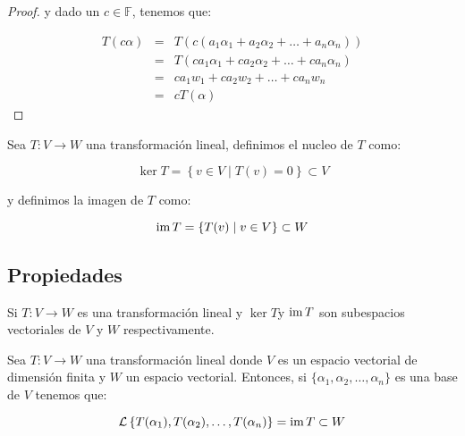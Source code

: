 \begin{proof}
			y dado un $c \in \mathbb{F}$, tenemos que:

			\begin{eqnarray*}
				T(c \alpha) & = & T(c (a_1 \alpha_1 + a_2 \alpha_2 + \dots + a_n \alpha_n)) \\
				& = & T(c a_1 \alpha_1 + c a_2 \alpha_2 + \dots + c a_n \alpha_n) \\
				& = & c a_1 w_1 + c a_2 w_2 + \dots + c a_n w_n \\
				& = & c T(\alpha)
			\end{eqnarray*}
		\end{proof}

		\begin{definicion}
			Sea $T \colon V \to W$ una transformación lineal, definimos el nucleo de $T$ como:

			\begin{equation}
				\ker{T} = \left\{ v \in V \mid T(v) = 0 \right\} \subset V
			\end{equation}

			y definimos la imagen de $T$ como:

			\begin{equation}
				\operatorname{im}{T} = \left\{ T(v) \mid v \in V \right\} \subset W
			\end{equation}
		\end{definicion}

	\subsection{Propiedades}

		\begin{proposicion}
			Si $T \colon V \to W$ es una transformación lineal y $\ker{T}$y $\operatorname{im}{T}$ son subespacios vectoriales de $V$ y $W$ respectivamente.
		\end{proposicion}

		\begin{proposicion}
			Sea $T \colon V \to W$ una transformación lineal donde $V$ es un espacio vectorial de dimensión finita y $W$ un espacio vectorial.
			Entonces, si $\{ \alpha_1, \alpha_2, \dots, \alpha_n \}$ es una base de $V$ tenemos que:

			\begin{equation}
				\mathcal{L} \left\{ T(\alpha_1), T(\alpha_2), \dots, T(\alpha_n) \right\} = \operatorname{im}{T} \subset W
			\end{equation}
		\end{proposicion}


